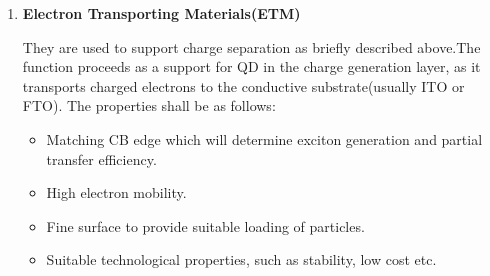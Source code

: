 \begin{enumerate}

\item \textbf{Electron Transporting Materials(ETM)}

They are used to support charge separation as briefly described above.The function proceeds as a support for QD in the charge generation layer, as it transports charged electrons to the conductive substrate(usually ITO or FTO). \cite{X.Gao2017} \cite{Tian2015} The properties shall be as follows:
\begin{itemize}
\item
  Matching CB edge which will determine exciton generation and
  partial transfer efficiency.
\item
  High electron mobility.
\item
  Fine surface to provide suitable loading of particles.
\item
  Suitable technological properties, such as stability, low cost etc.
\end{itemize}


\end{enumerate}
